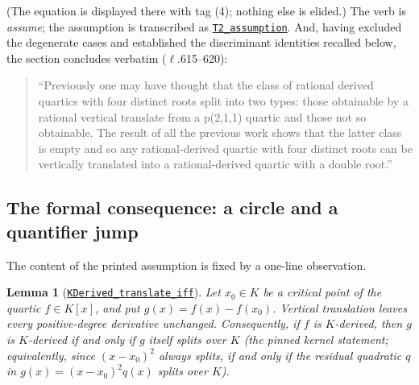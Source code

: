 \documentclass[11pt]{amsart}
\newtheorem{lemma}[theorem]{Lemma}
\newcommand{\repourl}{https://github.com/hirokifukui/rd-quartics-classification}
\newcommand{\repotag}{v1.1.0}
\newcommand{\leanline}[3]{\href{\repourl/blob/\repotag/#1\#L#2}{\texttt{#3}}}
\begin{document}
\noindent (The equation is displayed there with tag (4); nothing else
is elided.)  The verb is \emph{assume}; the assumption is transcribed
as \leanline{Gap/BMThm7Transcript.lean}{83}{T2\_assumption}.  And,
having excluded the degenerate cases and established the discriminant
identities recalled below, the section concludes verbatim
($\ell$.615--620):

\begin{quote}\small
``Previously one may have thought that the class of rational derived
quartics with four distinct roots split into two types: those
obtainable by a rational vertical translate from a p(2,1,1) quartic and
those not so obtainable. The result of all the previous work shows that
the latter class is empty and so any rational-derived quartic with four
distinct roots can be vertically translated into a rational-derived
quartic with a double root.''
\end{quote}

\subsection{The formal consequence: a circle and a quantifier jump}
\label{sec:gap:circle}

The content of the printed assumption is fixed by a one-line
observation.

\begin{lemma}[\leanline{Gap/BMThm7Transcript.lean}{89}{KDerived\_translate\_iff}]
\label{lem:circ}
Let $x_0\in K$ be a critical point of the quartic $f\in K[x]$, and put
$g(x)=f(x)-f(x_0)$.  Vertical translation leaves every positive-degree
derivative unchanged.  Consequently, if $f$ is $K$-derived, then $g$ is
$K$-derived if and only if $g$ itself splits over $K$ (the pinned
kernel statement; equivalently, since $(x-x_0)^2$ always splits, if and
only if the residual quadratic $q$ in $g(x)=(x-x_0)^2 q(x)$ splits over
$K$).
\end{lemma}
\end{document}
